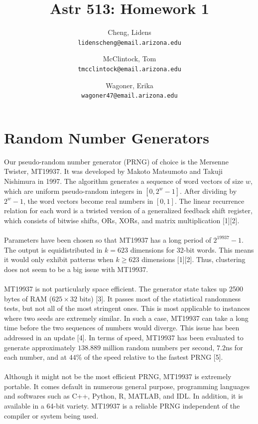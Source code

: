 \documentclass[12pt,a4paper]{article}
\author{
  Cheng, Lidens\\
  \texttt{lidenscheng@email.arizona.edu}
  \and
  McClintock, Tom\\
  \texttt{tmcclintock@email.arizona.edu}
  \and
  Wagoner, Erika\\
  \texttt{wagoner47@email.arizona.edu}
}
\title{Astr 513: Homework 1}
\begin{document}
\maketitle
  
\section{Random Number Generators}
Our pseudo-random number generator (PRNG) of choice is the Mersenne Twister, MT19937. It was developed by Makoto Matsumoto and Takuji Nishimura in 1997. The algorithm generates a sequence of word vectors of size $w$, which are uniform pseudo-random integers in $[0,2^w-1]$. After dividing by $2^w-1$, the word vectors become real numbers in $[0,1]$. The linear recurrence relation for each word is a twisted version of a generalized feedback shift register, which consists of bitwise shifts, ORs, XORs, and matrix multiplication [1][2]. \\\\ 
Parameters have been chosen so that MT19937 has a long period of $2^{19937}-1$. The output is equidistributed in $k=623$ dimensions for 32-bit words. This means it would only exhibit patterns when $k \geq 623$ dimensions [1][2]. Thus, clustering does not seem to be a big issue with MT19937.\\\\
MT19937 is not particularly space efficient. The generator state takes up 2500 bytes of RAM ($625 \times 32$ bits) [3]. It passes most of the statistical randomness tests, but not all of the most stringent ones. This is most applicable to instances where two seeds are extremely similar. In such a case, MT19937 can take a long time before the two sequences of numbers would diverge. This issue has been addressed in an update [4]. In terms of speed, MT19937 has been evaluated to generate approximately $138.889$ million random numbers per second, $7.2$ns for each number, and at $44\%$ of the speed relative to the fastest PRNG [5]. \\\\
Although it might not be the most efficient PRNG, MT19937 is extremely portable. It comes default in numerous general purpose, programming languages and softwares such as C++, Python, R, MATLAB, and IDL. In addition, it is available in a 64-bit variety. MT19937 is a reliable PRNG independent of the compiler or system being used.  
\end{document}

